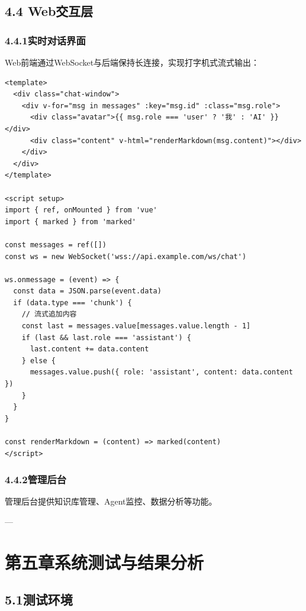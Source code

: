 \documentclass{harryopo-report}
\begin{document}
\section*{4.4 Web交互层}

\subsection*{4.4.1实时对话界面}

Web前端通过WebSocket与后端保持长连接，实现打字机式流式输出：

\begin{lstlisting}[style=plainstyle,caption={}]
<template>
  <div class="chat-window">
    <div v-for="msg in messages" :key="msg.id" :class="msg.role">
      <div class="avatar">{{ msg.role === 'user' ? '我' : 'AI' }}</div>
      <div class="content" v-html="renderMarkdown(msg.content)"></div>
    </div>
  </div>
</template>

<script setup>
import { ref, onMounted } from 'vue'
import { marked } from 'marked'

const messages = ref([])
const ws = new WebSocket('wss://api.example.com/ws/chat')

ws.onmessage = (event) => {
  const data = JSON.parse(event.data)
  if (data.type === 'chunk') {
    // 流式追加内容
    const last = messages.value[messages.value.length - 1]
    if (last && last.role === 'assistant') {
      last.content += data.content
    } else {
      messages.value.push({ role: 'assistant', content: data.content })
    }
  }
}

const renderMarkdown = (content) => marked(content)
</script>
\end{lstlisting}

\subsection*{4.4.2管理后台}

管理后台提供知识库管理、Agent监控、数据分析等功能。

---

\chapter*{第五章系统测试与结果分析}

\section*{5.1测试环境}
\end{document}
